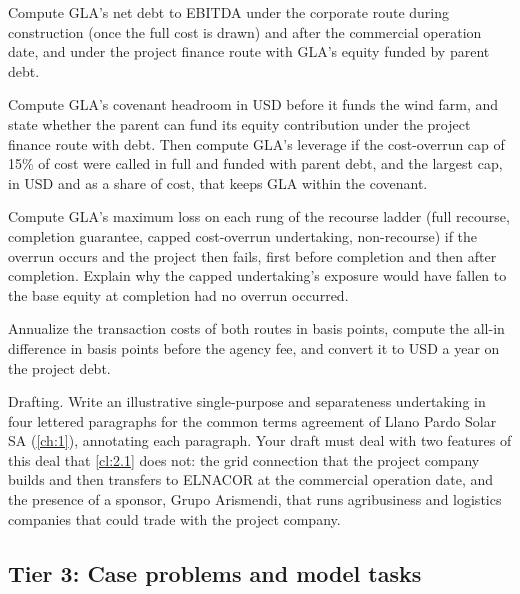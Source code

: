 \begin{exercise}\label{exr:2.6}
Compute GLA's net debt to EBITDA under the corporate route during construction (once the full cost is drawn) and after the commercial operation date, and under the project finance route with GLA's equity funded by parent debt.
\end{exercise}

\begin{exercise}\label{exr:2.7}
Compute GLA's covenant headroom in USD before it funds the wind farm, and state whether the parent can fund its equity contribution under the project finance route with debt. Then compute GLA's leverage if the cost-overrun cap of 15\% of cost were called in full and funded with parent debt, and the largest cap, in USD and as a share of cost, that keeps GLA within the covenant.
\end{exercise}

\begin{exercise}\label{exr:2.8}
Compute GLA's maximum loss on each rung of the recourse ladder (full recourse, completion guarantee, capped cost-overrun undertaking, non-recourse) if the overrun occurs and the project then fails, first before completion and then after completion. Explain why the capped undertaking's exposure would have fallen to the base equity at completion had no overrun occurred.
\end{exercise}

\begin{exercise}\label{exr:2.9}
Annualize the transaction costs of both routes in basis points, compute the all-in difference in basis points before the agency fee, and convert it to USD a year on the project debt.
\end{exercise}

\begin{exercise}\label{exr:2.10}
Drafting. Write an illustrative single-purpose and separateness undertaking in four lettered paragraphs for the common terms agreement of Llano Pardo Solar SA (\cref{ch:1}), annotating each paragraph. Your draft must deal with two features of this deal that \cref{cl:2.1} does not: the grid connection that the project company builds and then transfers to ELNACOR at the commercial operation date, and the presence of a sponsor, Grupo Arismendi, that runs agribusiness and logistics companies that could trade with the project company.
\end{exercise}

\subsection*{Tier 3: Case problems and model tasks}

